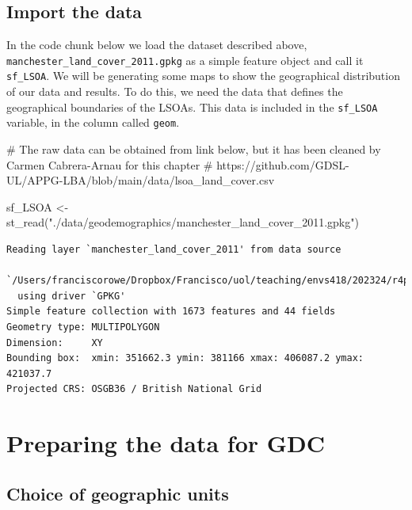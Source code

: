 \documentclass[
  letterpaper,
  DIV=11,
  numbers=noendperiod]{scrreprt}
\newenvironment{Shaded}{\begin{snugshade}}{\end{snugshade}}
\newcommand{\CommentTok}[1]{\textcolor[rgb]{0.37,0.37,0.37}{#1}}
\newcommand{\FunctionTok}[1]{\textcolor[rgb]{0.28,0.35,0.67}{#1}}
\newcommand{\NormalTok}[1]{\textcolor[rgb]{0.00,0.23,0.31}{#1}}
\newcommand{\OtherTok}[1]{\textcolor[rgb]{0.00,0.23,0.31}{#1}}
\newcommand{\StringTok}[1]{\textcolor[rgb]{0.13,0.47,0.30}{#1}}
\begin{document}
\hypertarget{import-the-data}{%
\subsection{Import the data}\label{import-the-data}}

In the code chunk below we load the dataset described above,
\texttt{manchester\_land\_cover\_2011.gpkg} as a simple feature object
and call it \texttt{sf\_LSOA}. We will be generating some maps to show
the geographical distribution of our data and results. To do this, we
need the data that defines the geographical boundaries of the LSOAs.
This data is included in the \texttt{sf\_LSOA} variable, in the column
called \texttt{geom}.

\begin{Shaded}
\begin{Highlighting}[]
\CommentTok{\# The raw data can be obtained from link below, but it has been cleaned by Carmen Cabrera{-}Arnau for this chapter}
\CommentTok{\# https://github.com/GDSL{-}UL/APPG{-}LBA/blob/main/data/lsoa\_land\_cover.csv}

\NormalTok{sf\_LSOA }\OtherTok{\textless{}{-}} \FunctionTok{st\_read}\NormalTok{(}\StringTok{"./data/geodemographics/manchester\_land\_cover\_2011.gpkg"}\NormalTok{)}
\end{Highlighting}
\end{Shaded}

\begin{verbatim}
Reading layer `manchester_land_cover_2011' from data source 
  `/Users/franciscorowe/Dropbox/Francisco/uol/teaching/envs418/202324/r4ps/data/geodemographics/manchester_land_cover_2011.gpkg' 
  using driver `GPKG'
Simple feature collection with 1673 features and 44 fields
Geometry type: MULTIPOLYGON
Dimension:     XY
Bounding box:  xmin: 351662.3 ymin: 381166 xmax: 406087.2 ymax: 421037.7
Projected CRS: OSGB36 / British National Grid
\end{verbatim}

\hypertarget{sec-sec34}{%
\section{Preparing the data for GDC}\label{sec-sec34}}

\hypertarget{choice-of-geographic-units}{%
\subsection{Choice of geographic
units}\label{choice-of-geographic-units}}
\end{document}
